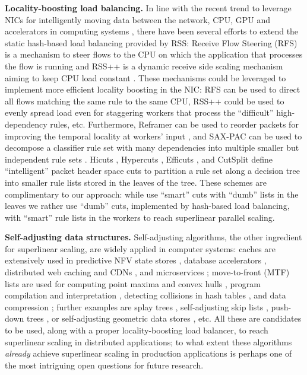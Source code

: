 \noindent%
\textbf{Locality-boosting load balancing.} %
In line with the recent trend to leverage NICs for intelligently moving data between the network, CPU, GPU and accelerators in computing systems \cite{sherry-ccr23}, there have been several efforts to extend the static hash-based load balancing provided by RSS: Receive Flow Steering (RFS) is a mechanism to steer flows to the CPU on which the application that processes the flow is running \cite{rss-linux} and RSS++ is a dynamic receive side scaling mechanism aiming to keep CPU load constant \cite{10.1145/3359989.3365412}. These mechanisms could be leveraged to implement more efficient locality boosting in the NIC: RFS can be used to direct all flows matching the same rule to the same CPU, RSS++ could be used to evenly spread load even for staggering workers that process the ``difficult'' high-dependency rules, etc. Furthermore, Reframer can be used to reorder packets for improving the temporal locality at workers' input \cite{276946,246322}, and SAX-PAC can be used to decompose a classifier rule set with many dependencies into multiple smaller but independent rule sets \cite{10.1145/2619239.2626294}.  Hicuts \cite{820051}, Hypercuts \cite{10.1145/863955.863980}, Efficuts \cite{10.1145/1851182.1851208}, and CutSplit \cite{8485947} define ``intelligent'' packet header space cuts \cite{180587} to partition a rule set along a decision tree into smaller rule lists stored in the leaves of the tree. These schemes are complimentary to our approach: while \cite{820051, 10.1145/863955.863980, 10.1145/1851182.1851208, 8485947} use ``smart'' cuts with ``dumb'' lists in the leaves we rather use ``dumb'' cuts, implemented by hash-based load balancing, with ``smart'' rule lists in the workers to reach superlinear parallel scaling.

\noindent%
\textbf{Self-adjusting data structures.} %
Self-adjusting algorithms, the other ingredient for superlinear scaling, are widely applied in computer systems: caches are extensively used in predictive NFV state stores \cite{295537}, database accelerators \cite{10.5555/1012889.1012894, 180324, ghigoff2021bmc}, distributed web caching and CDNs \cite{295603}, and microservices \cite{295493}; move-to-front (MTF) lists are used for computing point maxima and convex hulls \cite{BentleyCL93}, program compilation and interpretation \cite{HesterH85}, detecting collisions in hash tables \cite{HesterH85}, and data compression \cite{BentleySTW86}; further examples are splay trees \cite{SleatorT85Splay}, self-adjusting skip lists \cite{BoseDL08}, push-down trees \cite{Avin0020}, or self-adjusting geometric data stores \cite{ParkM12}, etc. All these are candidates to be used, along with a proper locality-boosting load balancer, to reach superlinear scaling in distributed applications; to what extent these algorithms \emph{already} achieve superlinear scaling in production applications is perhaps one of the most intriguing open questions for future research.
  
